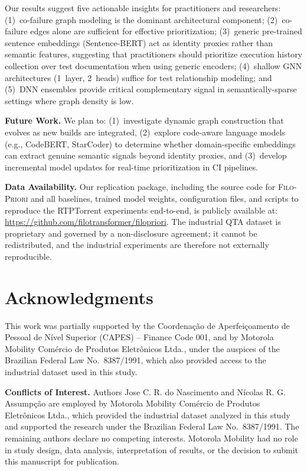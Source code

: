 \documentclass[10pt,journal,compsoc]{IEEEtran}
\newcommand{\filopriori}{\textsc{Filo-Priori}}
\begin{document}
Our results suggest five actionable insights for practitioners and researchers:
(1)~co-failure graph modeling is the dominant architectural component;
(2)~co-failure edges alone are sufficient for effective prioritization;
(3)~generic pre-trained sentence embeddings (Sentence-BERT) act as identity
proxies rather than semantic features, suggesting that
practitioners should prioritize execution history collection over test
documentation when using generic encoders;
(4)~shallow GNN architectures (1~layer, 2~heads) suffice for test
relationship modeling; and (5)~DNN ensembles provide critical complementary
signal in semantically-sparse settings where graph density is low.

\textbf{Future Work.} We plan to: (1)~investigate dynamic graph construction
that evolves as new builds are integrated, (2)~explore code-aware language
models (e.g., CodeBERT, StarCoder) to determine whether domain-specific
embeddings can extract genuine semantic signals beyond identity proxies,
and (3)~develop incremental model updates for real-time prioritization in
CI pipelines.

\textbf{Data Availability.} Our replication package, including the source
code for \filopriori{} and all baselines, trained model weights,
configuration files, and scripts to reproduce the RTPTorrent experiments
end-to-end, is publicly available at:
\url{https://github.com/filotransformer/filopriori}. The industrial QTA
dataset is proprietary and governed by a non-disclosure agreement; it cannot
be redistributed, and the industrial experiments are therefore not externally
reproducible.

\section*{Acknowledgments}
This work was partially supported by the Coordena\c{c}\~{a}o de
Aperfei\c{c}oamento de Pessoal de N\'{i}vel Superior (CAPES) -- Finance
Code 001, and by Motorola Mobility Com\'{e}rcio de Produtos Eletr\^{o}nicos
Ltda., under the auspices of the Brazilian Federal Law No.\ 8387/1991,
which also provided access to the industrial dataset used in this study.

\textbf{Conflicts of Interest.} Authors Jose C. R. do Nascimento and
N\'{i}colas R. G. Assump\c{c}\~{a}o are employed by Motorola Mobility
Com\'{e}rcio de Produtos Eletr\^{o}nicos Ltda., which provided the
industrial dataset analyzed in this study and supported the research
under the Brazilian Federal Law No.\ 8387/1991. The remaining authors
declare no competing interests. Motorola Mobility had no role in study
design, data analysis, interpretation of results, or the decision to
submit this manuscript for publication.
\end{document}
